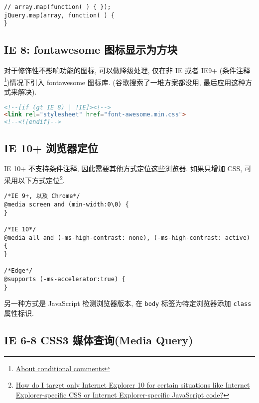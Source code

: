 \begin{lstlisting}
// array.map(function( ) { });
jQuery.map(array, function( ) {
}
\end{lstlisting}

\subsection{IE 8: fontawesome
图标显示为方块}\label{ie-8-fontawesome-ux56feux6807ux663eux793aux4e3aux65b9ux5757}

对于修饰性不影响功能的图标, 可以做降级处理, 仅在非 IE 或者 IE9+
(条件注释\footnote{\href{https://msdn.microsoft.com/en-us/library/ms537512(v=vs.85).aspx}{About
  conditional comments}})情况下引入 fontawesome 图标库.
(谷歌搜索了一堆方案都没用, 最后应用这种方式来解决).

\begin{lstlisting}[language=HTML]
<!--[if (gt IE 8) | !IE]><!-->
<link rel="stylesheet" href="font-awesome.min.css">
<!--<![endif]-->
\end{lstlisting}

\subsection{IE 10+
浏览器定位}\label{ie-10-ux6d4fux89c8ux5668ux5b9aux4f4d}

IE 10+ 不支持条件注释, 因此需要其他方式定位这些浏览器. 如果只增加 CSS,
可采用以下方式定位\footnote{\href{http://stackoverflow.com/questions/9900311/how-do-i-target-only-internet-explorer-10-for-certain-situations-like-internet-e/14916454\#14916454}{How
  do I target only Internet Explorer 10 for certain situations like
  Internet Explorer-specific CSS or Internet Explorer-specific
  JavaScript code?}}.

\begin{lstlisting}
/*IE 9+, 以及 Chrome*/
@media screen and (min-width:0\0) {
}

/*IE 10*/
@media all and (-ms-high-contrast: none), (-ms-high-contrast: active) {
}

/*Edge*/
@supports (-ms-accelerator:true) {
}
\end{lstlisting}

另一种方式是 JavaScript 检测浏览器版本, 在 \lstinline!body!
标签为特定浏览器添加 \lstinline!class! 属性标识.

\subsection{IE 6-8 CSS3 媒体查询(Media
Query)}\label{ie-6-8-css3-ux5a92ux4f53ux67e5ux8be2media-query}

